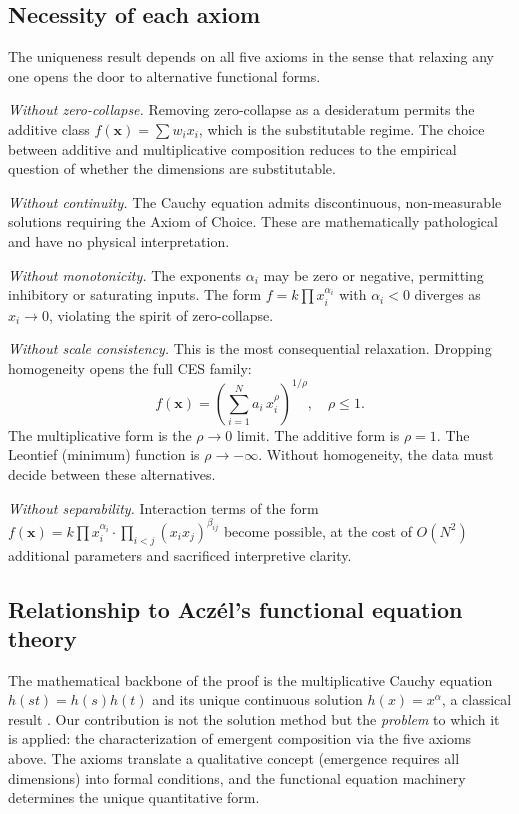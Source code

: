\documentclass[12pt, a4paper]{article}
\theoremstyle{definition}
\theoremstyle{remark}
\begin{document}
\subsection{Necessity of each axiom}

The uniqueness result depends on all five axioms in the sense that relaxing any one opens the door to alternative functional forms.

\textit{Without zero-collapse.} Removing zero-collapse as a desideratum permits the additive class $f(\mathbf{x}) = \sum w_i x_i$, which is the substitutable regime. The choice between additive and multiplicative composition reduces to the empirical question of whether the dimensions are substitutable.

\textit{Without continuity.} The Cauchy equation admits discontinuous, non-measurable solutions requiring the Axiom of Choice. These are mathematically pathological and have no physical interpretation.

\textit{Without monotonicity.} The exponents $\alpha_i$ may be zero or negative, permitting inhibitory or saturating inputs. The form $f = k \prod x_i^{\alpha_i}$ with $\alpha_i < 0$ diverges as $x_i \to 0$, violating the spirit of zero-collapse.

\textit{Without scale consistency.} This is the most consequential relaxation. Dropping homogeneity opens the full CES family:
\begin{equation}\label{eq:ces}
f(\mathbf{x}) = \left(\sum_{i=1}^{N} a_i \, x_i^{\rho}\right)^{1/\rho}, \quad \rho \leq 1.
\end{equation}
The multiplicative form is the $\rho \to 0$ limit. The additive form is $\rho = 1$. The Leontief (minimum) function is $\rho \to -\infty$. Without homogeneity, the data must decide between these alternatives.

\textit{Without separability.} Interaction terms of the form $f(\mathbf{x}) = k \prod x_i^{\alpha_i} \cdot \prod_{i < j} (x_i x_j)^{\beta_{ij}}$ become possible, at the cost of $O(N^2)$ additional parameters and sacrificed interpretive clarity.

\subsection{Relationship to Acz\'el's functional equation theory}

The mathematical backbone of the proof is the multiplicative Cauchy equation $h(st) = h(s)h(t)$ and its unique continuous solution $h(x) = x^\alpha$, a classical result \cite{aczel1966}. Our contribution is not the solution method but the \textit{problem} to which it is applied: the characterization of emergent composition via the five axioms above. The axioms translate a qualitative concept (emergence requires all dimensions) into formal conditions, and the functional equation machinery determines the unique quantitative form.
\end{document}
